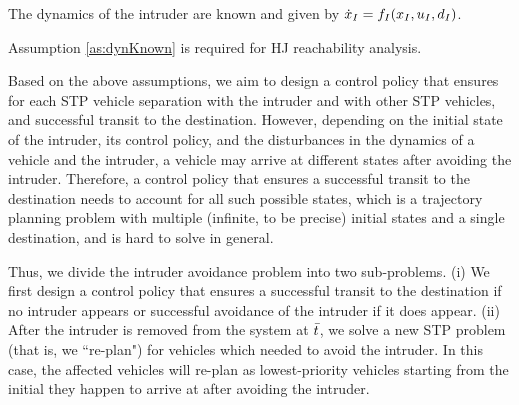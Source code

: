 \begin{assumption}
\label{as:dynKnown}
The dynamics of the intruder are known and given by $\dot{x}_I = f_I(x_I, u_I, d_I)$.
\end{assumption}
Assumption \ref{as:dynKnown} is required for HJ reachability analysis. 

Based on the above assumptions, we aim to design a control policy that ensures for each STP vehicle separation with the intruder and with other STP vehicles, and successful transit to the destination. However, depending on the initial state of the intruder, its control policy, and the disturbances in the dynamics of a vehicle and the intruder, a vehicle may arrive at different states after avoiding the intruder. Therefore, a control policy that ensures a successful transit to the destination needs to account for all such possible states, which is a trajectory planning problem with multiple (infinite, to be precise) initial states and a single destination, and is hard to solve in general. 

Thus, we divide the intruder avoidance problem into two sub-problems. (i) We first design a control policy that ensures a successful transit to the destination if no intruder appears or successful avoidance of the intruder if it does appear. (ii) After the intruder is removed from the system at $\bar{t}$, we solve a new STP problem (that is, we ``re-plan") for vehicles which needed to avoid the intruder. In this case, the affected vehicles will re-plan as lowest-priority vehicles starting from the initial they happen to arrive at after avoiding the intruder. 
